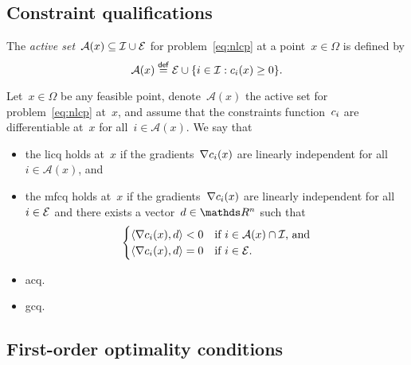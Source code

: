 \subsection{Constraint qualifications}

\begin{definition}
    The \emph{active set}~$\mathcal{A}(x) \subseteq \mathcal{I} \cup \mathcal{E}$ for problem~\cref{eq:nlcp} at a point~$x \in \Omega$ is defined by
    \begin{equation*}
        \mathcal{A}(x) \mathrel{\stackrel{\mathsf{def}}{=}} \mathcal{E} \cup \{i \in \mathcal{I} : c_{i}(x) \ge 0\}.
    \end{equation*}
\end{definition}

\begin{definition}
    Let~$x \in \Omega$ be any feasible point, denote~$\mathcal{A}(x)$ the active set for problem~\cref{eq:nlcp} at~$x$, and assume that the constraints function~$c_{i}$ are differentiable at~$x$ for all~$i \in \mathcal{A}(x)$.
    We say that
    \begin{itemize}
        \item the \gls{licq} holds at~$x$ if the gradients~$\nabla c_{i}(x)$ are linearly independent for all~$i \in \mathcal{A}(x)$, and
        \item the \gls{mfcq} holds at~$x$ if the gradients~$\nabla c_{i}(x)$ are linearly independent for all~$i \in \mathcal{E}$ and there exists a vector~$d \in \R^n$ such that
        \begin{equation*}
            \begin{cases}
                \langle\nabla c_{i}(x), d\rangle < 0    & \text{if~$i \in \mathcal{A}(x) \cap \mathcal{I}$, and}\\
                \langle\nabla c_{i}(x), d\rangle = 0    & \text{if~$i \in \mathcal{E}$}.
            \end{cases}
        \end{equation*}
    \end{itemize}
\end{definition}

\begin{itemize}
    \item \gls{acq}.
    \item \gls{gcq}.
\end{itemize}

\subsection{First-order optimality conditions}

